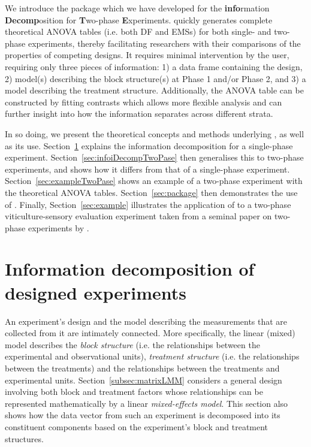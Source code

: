 \documentclass[article]{jss}
\begin{document}
We introduce the  package  which we have developed for the {\bf info}rmation {\bf Decomp}osition for {\bf T}wo-phase {\bf E}xperiments.  quickly generates complete theoretical ANOVA tables (i.e. both DF and EMSs)  for both single- and two-phase experiments, thereby facilitating researchers with their comparisons of the properties of competing designs. It requires minimal intervention by the user, requiring only three pieces of information: 1) a data frame containing the design, 2) model(s) describing the block structure(s) at Phase 1 and/or Phase 2, and 3) a model describing the treatment structure. Additionally, the ANOVA table can be constructed by fitting contrasts which allows more flexible analysis and can further insight into how the information separates across different strata.

In so doing, we present the theoretical concepts and methods underlying , as well as its use. Section~\ref{sec:infoDecomp} explains the information decomposition for a single-phase experiment. Section~\ref{sec:infoiDecompTwoPase} then generalises this to two-phase experiments, and shows how it differs from that of a single-phase experiment. Section~\ref{sec:exampleTwoPase} shows an example of a two-phase experiment with the theoretical ANOVA tables. Section~\ref{sec:package} then demonstrates the use of . Finally, Section~\ref{sec:example} illustrates the application of  to a two-phase viticulture-sensory evaluation experiment taken from a seminal paper on two-phase experiments by \cite{Brien1999}.

\section{Information decomposition of designed experiments} 
\label{sec:infoDecomp}
An experiment's design and the model describing the measurements that are collected from it are intimately connected. More specifically, the linear (mixed) model describes the \emph{block structure} (i.e. the relationships between the experimental and observational units), \emph{treatment structure} (i.e. the relationships between the treatments) and the relationships between the treatments and experimental units. Section~\ref{subsec:matrixLMM} considers a general design involving both block and treatment factors whose relationships can be represented mathematically by a linear \emph{mixed-effects model}. This section also shows how the data vector from such an experiment is decomposed into its constituent components based on the experiment's block and treatment structures.
\end{document}
